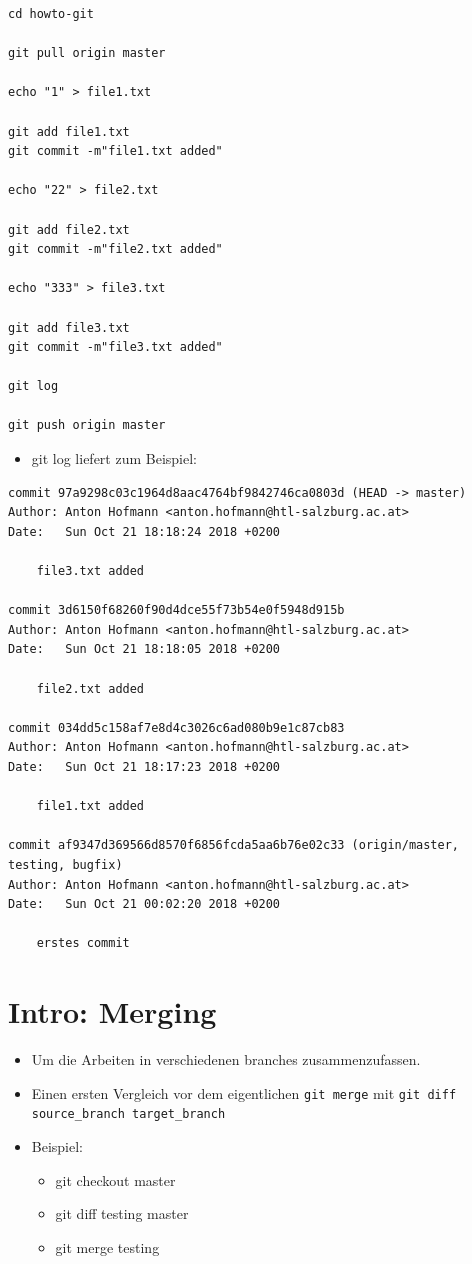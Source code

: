 \documentclass[11pt]{article}
\begin{document}
\begin{verbatim}
cd howto-git

git pull origin master

echo "1" > file1.txt

git add file1.txt
git commit -m"file1.txt added"

echo "22" > file2.txt

git add file2.txt
git commit -m"file2.txt added"

echo "333" > file3.txt

git add file3.txt
git commit -m"file3.txt added"

git log

git push origin master
\end{verbatim}


\begin{itemize}
\item git log liefert zum Beispiel:
\end{itemize}
\begin{verbatim}
commit 97a9298c03c1964d8aac4764bf9842746ca0803d (HEAD -> master)
Author: Anton Hofmann <anton.hofmann@htl-salzburg.ac.at>
Date:   Sun Oct 21 18:18:24 2018 +0200

	file3.txt added

commit 3d6150f68260f90d4dce55f73b54e0f5948d915b
Author: Anton Hofmann <anton.hofmann@htl-salzburg.ac.at>
Date:   Sun Oct 21 18:18:05 2018 +0200

	file2.txt added

commit 034dd5c158af7e8d4c3026c6ad080b9e1c87cb83
Author: Anton Hofmann <anton.hofmann@htl-salzburg.ac.at>
Date:   Sun Oct 21 18:17:23 2018 +0200

	file1.txt added

commit af9347d369566d8570f6856fcda5aa6b76e02c33 (origin/master, testing, bugfix)
Author: Anton Hofmann <anton.hofmann@htl-salzburg.ac.at>
Date:   Sun Oct 21 00:02:20 2018 +0200

	erstes commit

\end{verbatim}


\section{Intro: Merging}
\label{sec:org7a9a2e9}

\begin{itemize}
\item Um die Arbeiten in verschiedenen branches zusammenzufassen.

\item Einen ersten Vergleich vor dem eigentlichen \texttt{git merge} mit \texttt{git diff source\_branch target\_branch}

\item Beispiel:
\begin{itemize}
\item git checkout master
\item git diff testing master
\item git merge testing
\end{itemize}
\end{itemize}
\end{document}
